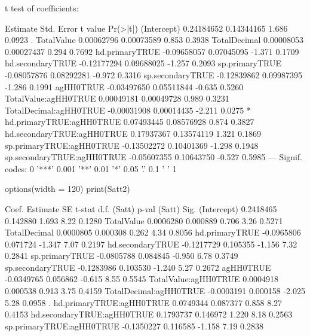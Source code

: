 \begin{Schunk}
\begin{Soutput}
t test of coefficients:

                              Estimate  Std. Error t value Pr(>|t|)  
(Intercept)                 0.24184652  0.14344165   1.686   0.0923 .
TotalValue                  0.00062796  0.00073589   0.853   0.3938  
TotalDecimal                0.00008053  0.00027437   0.294   0.7692  
hd.primaryTRUE             -0.09658057  0.07045095  -1.371   0.1709  
hd.secondaryTRUE           -0.12177294  0.09688025  -1.257   0.2093  
sp.primaryTRUE             -0.08057876  0.08292281  -0.972   0.3316  
sp.secondaryTRUE           -0.12839862  0.09987395  -1.286   0.1991  
agHH0TRUE                  -0.03497650  0.05511844  -0.635   0.5260  
TotalValue:agHH0TRUE        0.00049181  0.00049728   0.989   0.3231  
TotalDecimal:agHH0TRUE     -0.00031908  0.00014435  -2.211   0.0275 *
hd.primaryTRUE:agHH0TRUE    0.07493445  0.08576928   0.874   0.3827  
hd.secondaryTRUE:agHH0TRUE  0.17937367  0.13574119   1.321   0.1869  
sp.primaryTRUE:agHH0TRUE   -0.13502272  0.10401369  -1.298   0.1948  
sp.secondaryTRUE:agHH0TRUE -0.05607355  0.10643750  -0.527   0.5985  
---
Signif. codes:  0 '***' 0.001 '**' 0.01 '*' 0.05 '.' 0.1 ' ' 1
\end{Soutput}
\begin{Sinput}
options(width = 120)
print(Satt2)
\end{Sinput}
\begin{Soutput}
                      Coef.   Estimate       SE t-stat d.f. (Satt) p-val (Satt) Sig.
                (Intercept)  0.2418465 0.142880  1.693        8.22       0.1280     
                 TotalValue  0.0006280 0.000889  0.706        3.26       0.5271     
               TotalDecimal  0.0000805 0.000308  0.262        4.34       0.8056     
             hd.primaryTRUE -0.0965806 0.071724 -1.347        7.07       0.2197     
           hd.secondaryTRUE -0.1217729 0.105355 -1.156        7.32       0.2841     
             sp.primaryTRUE -0.0805788 0.084845 -0.950        6.78       0.3749     
           sp.secondaryTRUE -0.1283986 0.103530 -1.240        5.27       0.2672     
                  agHH0TRUE -0.0349765 0.056862 -0.615        8.55       0.5545     
       TotalValue:agHH0TRUE  0.0004918 0.000538  0.913        3.75       0.4159     
     TotalDecimal:agHH0TRUE -0.0003191 0.000158 -2.025        5.28       0.0958    .
   hd.primaryTRUE:agHH0TRUE  0.0749344 0.087377  0.858        8.27       0.4153     
 hd.secondaryTRUE:agHH0TRUE  0.1793737 0.146972  1.220        8.18       0.2563     
   sp.primaryTRUE:agHH0TRUE -0.1350227 0.116585 -1.158        7.19       0.2838     

\end{Soutput}
\end{Schunk}
